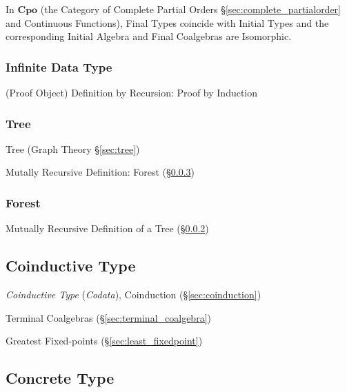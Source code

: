 In $\mathbf{Cpo}$ (the Category of Complete Partial Orders
\S\ref{sec:complete_partialorder} and Continuous Functions), Final
Types coincide with Initial Types and the corresponding Initial
Algebra and Final Coalgebras are Isomorphic.



\subsubsection{Infinite Data Type}\label{sec:infinite_datatype}

(Proof Object) Definition by Recursion: Proof by Induction



\subsubsection{Tree}\label{sec:tree_type}

Tree (Graph Theory \S\ref{sec:tree})

Mutally Recursive Definition: Forest (\S\ref{sec:forest_type})



\subsubsection{Forest}\label{sec:forest_type}

Mutually Recursive Definition of a Tree (\S\ref{sec:tree_type})



\subsection{Coinductive Type}\label{sec:coinductive_type}

\emph{Coinductive Type} (\emph{Codata}), Coinduction
(\S\ref{sec:coinduction})

Terminal Coalgebras (\S\ref{sec:terminal_coalgebra})

Greatest Fixed-points (\S\ref{sec:least_fixedpoint})



\subsection{Concrete Type}\label{sec:concrete_type}

